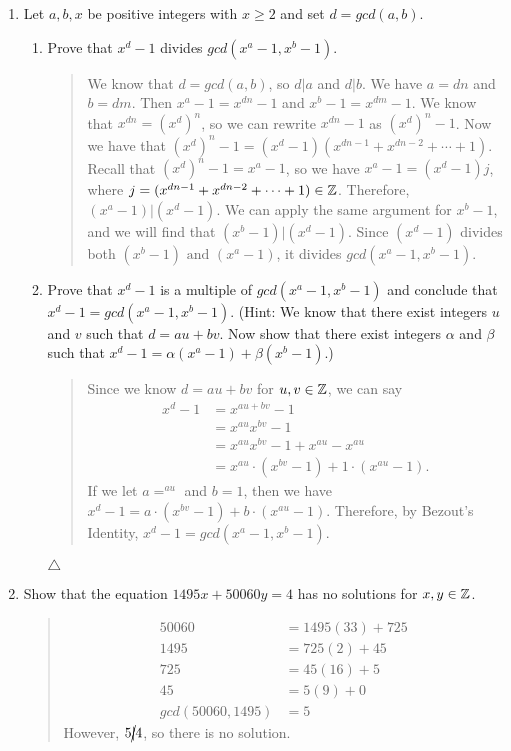 \documentclass{hw}
\begin{document}
\begin{enumerate}
\item Let $a, b, x$ be positive integers with $x \geq 2$ and set $d = gcd(a, b)$.
\begin{enumerate}
\item Prove that $x^{d} - 1$ divides $gcd(x^{a} - 1, x^{b} - 1)$.
\begin{quote}
We know that $d = gcd(a, b)$, so $d|a$ and $d|b$. We have $a=dn$ and $b=dm$. Then $x^{a}-1=x^{dn}-1$ and
$x^{b}-1=x^{dm}-1$. We know that $x^{dn}=(x^{d})^{n}$, so we can rewrite $x^{dn}-1$ as $(x^{d})^{n}-1$.
Now we have that $(x^{d})^{n}-1 = (x^{d}-1)(x^{dn-1}+x^{dn-2}+\cdots+1)$. Recall that
$(x^{d})^{n}-1 = x^{a} - 1$, so we have $x^{a} - 1 = (x^{d}-1)j$, where
$j=(x^{dn-1}+x^{dn-2}+\cdots+1)\in\mathbb{Z}$. Therefore, $(x^{a} - 1)|(x^{d}-1)$. We can apply the same
argument for $x^{b}-1$, and we will find that $(x^{b} - 1)|(x^{d}-1)$. Since $(x^{d}-1)$ divides both
$(x^{b}-1) \text{ and } (x^{a}-1)$, it divides $gcd(x^{a} - 1, x^{b} - 1)$.
\end{quote}
\item Prove that $x^{d}-1$ is a multiple of $gcd(x^{a}-1,x^{b}-1)$ and conclude that
$x^{d}-1 = gcd(x^{a}-1,x^{b}-1)$. (Hint: We know that there exist integers $u$ and $v$ such that
$d = au + bv$. Now show that there exist integers $\alpha$ and $\beta$ such that
$x^{d}-1 = \alpha(x^{a}-1) + \beta(x^{b}-1)$.)
\begin{quote}
Since we know $d=au+bv$ for $u,v\in\mathbb{Z}$, we can say
\begin{align*}
x^{d}-1 &= x^{au+bv}-1\\
&= x^{au}x^{bv}-1\\
&= x^{au}x^{bv}-1+x^{au}-x^{au}\\
&= x^{au}\cdot(x^{bv}-1)+1\cdot(x^{au}-1).
\end{align*}
If we let $a=^{au}$ and $b=1$, then we have $x^{d}-1 = a\cdot(x^{bv}-1)+b\cdot(x^{au}-1)$. Therefore,
by Bezout's Identity, $x^{d}-1 = gcd(x^{a}-1,x^{b}-1)$.
\end{quote}
$\triangle$
\end{enumerate}


\item Show that the equation $1495x + 50060y = 4$ has no solutions for $x,y\in\mathbb{Z}$.
\begin{quote}
\begin{align*}
50060 &= 1495(33) + 725\\
1495 &= 725(2) + 45\\
725 &= 45(16) + 5\\
45 &= 5(9) + 0\\
gcd(50060,1495) &= 5
\end{align*}
However, $5\cancel{|}4$, so there is no solution.
\end{quote}


\end{enumerate}
\end{document}
